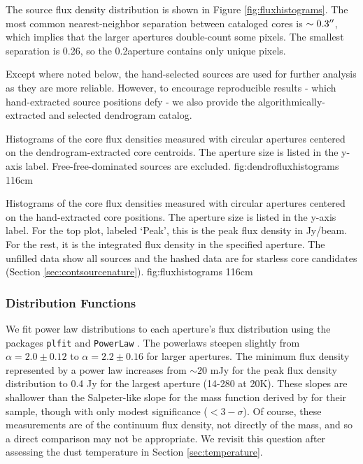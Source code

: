 \documentclass{aa}
\begin{document}
The source flux density distribution is shown in Figure
\ref{fig:fluxhistograms}.  The most common nearest-neighbor separation between
cataloged cores is $\sim0.3\mbox{$^{\prime\prime}$}$, which implies that the larger apertures
double-count some pixels.  The smallest separation is
0.26\arcsec, so the 0.2\arcsec aperture contains only unique pixels.


Except where noted below, the hand-selected sources are used for further
analysis as they are more reliable.  However, to encourage reproducible results
- which hand-extracted source positions defy - we also provide the
algorithmically-extracted and selected dendrogram catalog.

{Histograms of the core flux densities measured with circular apertures centered
on the dendrogram-extracted core centroids.  The aperture size is listed 
in the y-axis label.  Free-free-dominated sources are excluded.}
{fig:dendrofluxhistograms}
{1}{16cm}

{Histograms of the core flux densities measured with circular apertures centered
on the hand-extracted core positions.  The aperture size is listed 
in the y-axis label.  For the top plot, labeled `Peak', this is the peak
flux density in Jy/beam.  For the rest, it is the integrated flux density
in the specified aperture.  The unfilled data show all sources and the hashed
data are for starless core candidates (Section \ref{sec:contsourcenature}).}
{fig:fluxhistograms}
{1}{16cm}


\subsubsection{Distribution Functions}
\label{sec:distributionfunctions}
We fit power law distributions to each aperture's flux distribution using the
packages \texttt{plfit} and \texttt{PowerLaw}
\citep[https://github.com/keflavich/plfit,
https://github.com/jeffalstott/powerlaw;][]{Clauset2007a,Alstott2014a}.  The
powerlaws steepen slightly from $\alpha=2.0\pm0.12$ to $\alpha=2.2\pm0.16$ for
larger apertures.  The minimum flux density represented by a power law
increases from $\sim20$ mJy for the peak flux density distribution to 0.4 Jy
for the largest aperture (14-280 \msun at 20K).  These slopes are shallower
than the Salpeter-like slope for the mass function derived by
\citep{Konyves2015a} for their sample, though with only modest significance
($<3-\sigma$).  Of course, these measurements are of the continuum flux
density, not directly of the mass, and so a direct comparison may not be
appropriate.  We revisit this question after assessing the dust temperature in
Section \ref{sec:temperature}.
\end{document}
